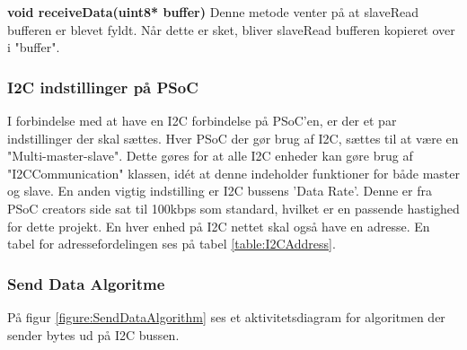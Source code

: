 \noindent\textbf{void receiveData(uint8* buffer)}\newline
Denne metode venter på at slaveRead bufferen er blevet fyldt. Når dette er sket, bliver slaveRead bufferen kopieret over i "buffer".

\subsubsection{I2C indstillinger på PSoC}
I forbindelse med at have en I2C forbindelse på PSoC'en, er der et par indstillinger der skal sættes. Hver PSoC der gør brug af I2C, sættes til at være en "Multi-master-slave". Dette gøres for at alle I2C enheder kan gøre brug af "I2CCommunication" klassen, idét at denne indeholder funktioner for både master og slave. 
En anden vigtig indstilling er I2C bussens 'Data Rate'. Denne er fra PSoC creators side sat til 100kbps som standard, hvilket er en passende hastighed for dette projekt.
En hver enhed på I2C nettet skal også have en adresse. En tabel for adressefordelingen ses på tabel \ref{table:I2CAddress}.

\subsubsection{Send Data Algoritme}

På figur \ref{figure:SendDataAlgorithm} ses et aktivitetsdiagram for algoritmen der sender bytes ud på I2C bussen.

